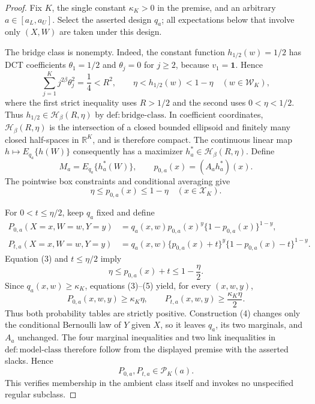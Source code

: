 \documentclass{article}
\begin{document}
\begin{proof}
Fix \(K\), the single constant \(\kappa_K>0\) in the premise, and an arbitrary \(a\in[a_L,a_U]\). Select the asserted design \(q_a\); all expectations below that involve only \((X,W)\) are taken under this design.

The bridge class is nonempty. Indeed, the constant function \(h_{1/2}(w)=1/2\) has DCT coefficients \(\theta_1=1/2\) and \(\theta_j=0\) for \(j\ge2\), because \(v_1=\mathbf 1\). Hence
\[
\sum_{j=1}^K j^{2\beta}\theta_j^2=\frac14<R^2,
\qquad
\eta<h_{1/2}(w)<1-\eta
\quad(w\in\mathcal W_K),
\tag{1}
\]
where the first strict inequality uses \(R>1/2\) and the second uses \(0<\eta<1/2\). Thus \(h_{1/2}\in\mathcal H_\beta(R,\eta)\) by \(\mathrm{def:bridge\mbox{-}class}\). In coefficient coordinates, \(\mathcal H_\beta(R,\eta)\) is the intersection of a closed bounded ellipsoid and finitely many closed half-spaces in \(\mathbb R^K\), and is therefore compact. The continuous linear map \(h\mapsto E_{q_a}\{h(W)\}\) consequently has a maximizer \(h_a^*\in\mathcal H_\beta(R,\eta)\). Define
\[
M_a=E_{q_a}\{h_a^*(W)\},
\qquad
p_{0,a}(x)=(A_ah_a^*)(x).
\tag{2}
\]
The pointwise box constraints and conditional averaging give
\[
\eta\le p_{0,a}(x)\le1-\eta
\quad(x\in\mathcal X_K).
\tag{3}
\]

For \(0<t\le\eta/2\), keep \(q_a\) fixed and define
\[
\begin{aligned}
P_{0,a}(X=x,W=w,Y=y)
&=q_a(x,w)p_{0,a}(x)^y\{1-p_{0,a}(x)\}^{1-y},\\
P_{t,a}(X=x,W=w,Y=y)
&=q_a(x,w)\{p_{0,a}(x)+t\}^y
  \{1-p_{0,a}(x)-t\}^{1-y}.
\end{aligned}
\tag{4}
\]
Equation (3) and \(t\le\eta/2\) imply
\[
\eta\le p_{0,a}(x)+t\le1-\frac\eta2.
\tag{5}
\]
Since \(q_a(x,w)\ge\kappa_K\), equations (3)--(5) yield, for every \((x,w,y)\),
\[
P_{0,a}(x,w,y)\ge\kappa_K\eta,
\qquad
P_{t,a}(x,w,y)\ge\frac{\kappa_K\eta}{2}.
\tag{6}
\]
Thus both probability tables are strictly positive. Construction (4) changes only the conditional Bernoulli law of \(Y\) given \(X\), so it leaves \(q_a\), its two marginals, and \(A_a\) unchanged. The four marginal inequalities and two link inequalities in \(\mathrm{def:model\mbox{-}class}\) therefore follow from the displayed premise with the asserted slacks. Hence
\[
P_{0,a},P_{t,a}\in\mathcal P_K(a).
\tag{7}
\]
This verifies membership in the ambient class itself and invokes no unspecified regular subclass.


\end{proof}
\end{document}
